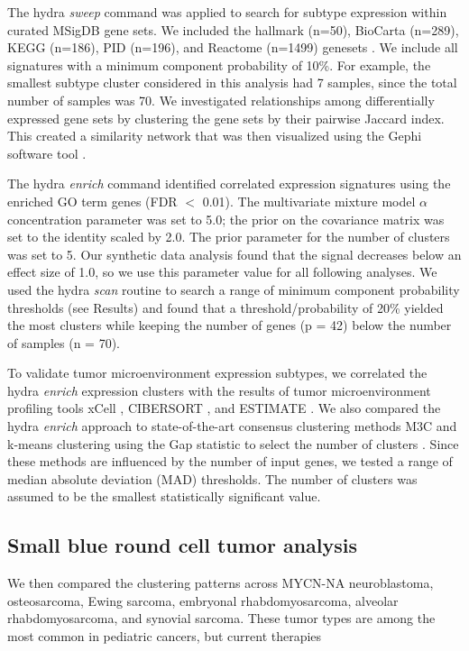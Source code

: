 \documentclass[10pt,letterpaper]{article}
\begin{document}
The hydra \textit{sweep} command was applied to search for subtype expression within curated MSigDB gene sets. We included the hallmark (n=50), BioCarta (n=289), KEGG (n=186), PID (n=196), and Reactome (n=1499) genesets \cite{liberzonMolecularSignaturesDatabase2011}. We include all signatures with a minimum component probability of 10\%. For example, the smallest subtype cluster considered in this analysis had 7 samples, since the total number of samples was 70. We investigated relationships among differentially expressed gene sets by clustering the gene sets by their pairwise Jaccard index. This created a similarity network that was then visualized using the Gephi software tool \cite{bastian2009gephi}.

The hydra \textit{enrich} command identified correlated expression signatures using the enriched GO term genes (FDR $<$ 0.01). The multivariate mixture model $\alpha$ concentration parameter was set to 5.0; the prior on the covariance matrix was set to the identity scaled by 2.0. The prior parameter for the number of clusters was set to 5. Our synthetic data analysis found that the signal decreases below an effect size of 1.0, so we use this parameter value for all following analyses. We used the hydra \textit{scan} routine to search a range of minimum component probability thresholds (see Results) and found that a threshold/probability of 20\% yielded the most clusters while keeping the number of genes (p = 42) below the number of samples (n = 70).

To validate tumor microenvironment expression subtypes, we correlated the hydra \textit{enrich} expression clusters with the results of tumor microenvironment profiling tools xCell \cite{aranXCellDigitallyPortraying2017}, CIBERSORT \cite{newmanRobustEnumerationCell2015}, and ESTIMATE \cite{yoshiharaInferringTumourPurity2013a}. We also compared the hydra \textit{enrich} approach to state-of-the-art consensus clustering methods M3C \cite{johnM3CMonteCarlo2018} and k-means clustering using the Gap statistic to select the number of clusters \cite{tibshirani2001estimating}. Since these methods are influenced by the number of input genes, we tested a range of median absolute deviation (MAD) thresholds. The number of clusters was assumed to be the smallest statistically significant value.

\subsection*{Small blue round cell tumor analysis}
We then compared the clustering patterns across MYCN-NA neuroblastoma, osteosarcoma, Ewing sarcoma, embryonal rhabdomyosarcoma, alveolar rhabdomyosarcoma, and synovial sarcoma. These tumor types are among the most common in pediatric cancers, but current therapies
\end{document}
